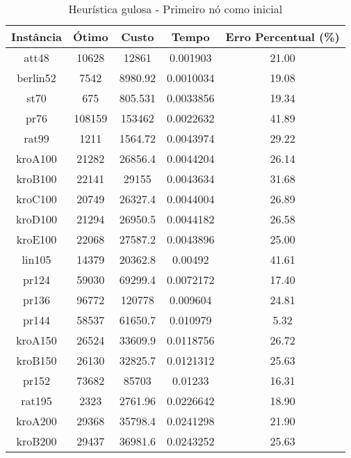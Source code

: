 \documentclass[10pt]{extarticle} %
\begin{document}
\begin{table}[h]
    \centering
    \begin{tabular}{|c|c|c|c|c|} \hline 
         \textbf{Instância} & \textbf{Ótimo} & \textbf{Custo} & \textbf{Tempo} & \textbf{Erro Percentual (\%)} \\ \hline 
         att48       & 10628     & 12861    & 0.001903  & 21.00 \\ \hline
         berlin52    & 7542      & 8980.92  & 0.0010034 & 19.08 \\ \hline 
         st70        & 675       & 805.531  & 0.0033856 & 19.34 \\ \hline 
         pr76        & 108159    & 153462   & 0.0022632 & 41.89 \\ \hline 
         rat99       & 1211      & 1564.72  & 0.0043974 & 29.22 \\ \hline 
         kroA100     & 21282     & 26856.4  & 0.0044204 & 26.14 \\ \hline 
         kroB100     & 22141     & 29155    & 0.0043634 & 31.68 \\ \hline 
         kroC100     & 20749     & 26327.4  & 0.0044004 & 26.89 \\ \hline 
         kroD100     & 21294     & 26950.5  & 0.0044182 & 26.58 \\ \hline 
         kroE100     & 22068     & 27587.2  & 0.0043896 & 25.00 \\ \hline 
         lin105      & 14379     & 20362.8  & 0.00492   & 41.61 \\ \hline 
         pr124       & 59030     & 69299.4  & 0.0072172 & 17.40 \\ \hline 
         pr136       & 96772     & 120778   & 0.009604  & 24.81 \\ \hline 
         pr144       & 58537     & 61650.7  & 0.010979  & 5.32  \\ \hline 
         kroA150     & 26524     & 33609.9  & 0.0118756 & 26.72 \\ \hline 
         kroB150     & 26130     & 32825.7  & 0.0121312 & 25.63 \\ \hline 
         pr152       & 73682     & 85703    & 0.01233   & 16.31 \\ \hline          
         rat195      & 2323      & 2761.96  & 0.0226642 & 18.90 \\ \hline            
         kroA200     & 29368     & 35798.4  & 0.0241298 & 21.90 \\ \hline         
         kroB200     & 29437     & 36981.6  & 0.0243252 & 25.63 \\ \hline 
    \end{tabular}
    \caption{Heurística gulosa - Primeiro nó como inicial}
    \label{tab:my_label}
\end{table}
\end{document}
